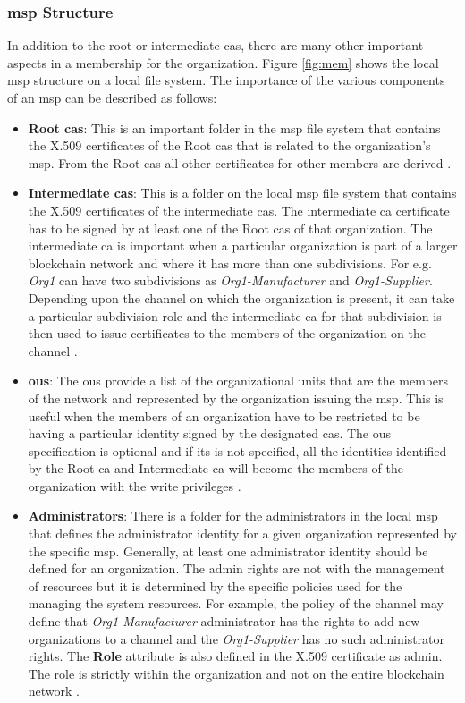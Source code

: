 \documentclass[
  a4paper,  %
  twoside,  %
  bibliography=totoc,
  headsepline,
  cleardoublepage=empty,
  parskip=half,
  draft=false
]{scrbook}
\begin{document}
\subsubsection{\gls{msp} Structure}
In addition to the root or intermediate \glspl{ca}, there are many other important aspects in a membership for the organization. Figure \ref{fig:mem} shows the local \gls{msp} structure on a local file system. The importance of the various components of an \gls{msp} can be described as follows:
\begin{itemize}
  \item \textbf{Root \glspl{ca}}: This is an important folder in the \gls{msp} file system that contains the X.509 certificates of the Root \glspl{ca} that is related to the organization's \gls{msp}. From the Root \glspl{ca} all other certificates for other members are derived \cite{Membership}.
  \item \textbf{Intermediate \glspl{ca}}: This is a folder on the local \gls{msp} file system that contains the X.509 certificates of the intermediate \glspl{ca}. The intermediate \gls{ca} certificate has to be signed by at least one of the Root \glspl{ca} of that organization. The intermediate \gls{ca} is important when a particular organization is part of a larger blockchain network and where it has more than one subdivisions. For e.g. \textit{Org1} can have two subdivisions as \textit{Org1-Manufacturer} and \textit{Org1-Supplier}. Depending upon the channel on which the organization is present, it can take a particular subdivision role and the intermediate \gls{ca} for that subdivision is then used to issue certificates to the members of the organization on the channel \cite{Membership}.
  \item \textbf{\glspl{ou}}: The \glspl{ou} provide a list of the organizational units that are the members of the network and represented by the organization issuing the \gls{msp}. This is useful when the members of an organization have to be restricted to be having a particular identity signed by the designated \glspl{ca}. The \glspl{ou} specification is optional and if its is not specified, all the identities identified by the Root \gls{ca} and Intermediate \gls{ca} will become the members of the organization with the write privileges \cite{Membership}.
  \item \textbf{Administrators}: There is a folder for the administrators in the local \gls{msp} that defines the administrator identity for a given organization represented by the specific \gls{msp}. Generally, at least one administrator identity should be defined for an organization. The admin rights are not with the management of resources but it is determined by the specific policies used for the managing the system resources. For example, the policy of the channel may define that \textit{Org1-Manufacturer} administrator has the rights to add new organizations to a channel and the \textit{Org1-Supplier} has no such administrator rights. The \textbf{Role} attribute is also defined in the X.509 certificate as admin. The role is strictly within the organization and not on the entire blockchain network \cite{Membership}.

\end{itemize}
\end{document}
